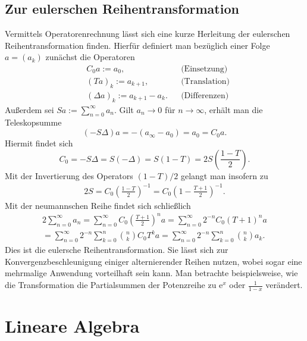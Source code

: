 \documentclass[a4paper,10pt,fleqn,twocolumn,twoside,dvipdfmx]{scrartcl}
\numberwithin{equation}{section}
\newcommand{\ee}{\mathrm e}
\theoremstyle{rmbox}
\begin{document}
\subsection{Zur eulerschen Reihentransformation}

Vermittels Operatorenrechnung lässt sich eine kurze Herleitung der
eulerschen Reihentransformation finden. Hierfür definiert man
bezüglich einer Folge $a=(a_k)$ zunächst die Operatoren
\begin{align*}
&C_0 a := a_0, &&\text{(Einsetzung)}\\
&(Ta)_k := a_{k+1},&&\text{(Translation)}\\
&(\Delta a)_k := a_{k+1}-a_k.&&\text{(Differenzen)}
\end{align*}
Außerdem sei $Sa:=\sum_{n=0}^\infty a_n$.
Gilt $a_n\to 0$ für $n\to\infty$, erhält man
die Teleskopsumme
\[(-S\Delta)a = -(a_\infty - a_0) = a_0 = C_0 a.\]
Hiermit findet sich
\[C_0 = -S\Delta = S(-\Delta) = S(1-T) = 2S\left(\frac{1-T}{2}\right).\]
Mit der Invertierung des Operators $(1-T)/2$ gelangt man
insofern zu
\begin{gather*}
2S = C_0\left(\frac{1-T}{2}\right)^{-1}
= C_0\left(1-\frac{T+1}{2}\right)^{-1}.
\end{gather*}
Mit der neumannschen Reihe findet sich schließlich
\begin{gather*}
2\sum_{n=0}^\infty a_n = \sum_{n=0}^\infty C_0\left(\frac{T+1}{2}\right)^n a
= \sum_{n=0}^\infty 2^{-n} C_0(T+1)^n a\\
= \sum_{n=0}^\infty 2^{-n}\sum_{k=0}^n\binom{n}{k}C_0 T^k a
= \sum_{n=0}^\infty 2^{-n}\sum_{k=0}^n\binom{n}{k} a_k.
\end{gather*}
Dies ist die eulersche Reihentransformation. Sie lässt sich zur
Konvergenzbeschleunigung einiger alternierender Reihen nutzen, wobei
sogar eine mehrmalige Anwendung vorteilhaft sein kann. Man betrachte
beispielsweise, wie die Transformation die Partialsummen der Potenzreihe
zu $\ee^x$ oder $\frac{1}{1-x}$ verändert.

\section{Lineare Algebra}
\end{document}
